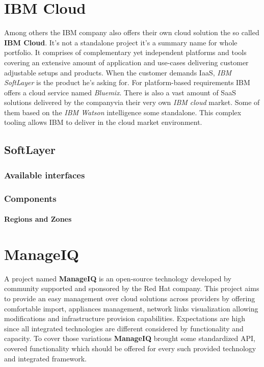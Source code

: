 \chapter{IBM Cloud}
\label{chap:IBM Cloud}

Among others the IBM company also offers their own cloud solution the so called \textbf{IBM Cloud}. It's not a standalone project it's a summary name for whole portfolio. It comprises of complementary yet independent platforms and tools covering an extensive amount of application and use-cases delivering customer adjustable setups and products. When the customer demands IaaS, \emph{IBM SoftLayer} is the product he's asking for. For platform-based requirements IBM offers a cloud service named \emph{Bluemix}. There is also a vast amount of SaaS solutions delivered by the companyvia their very own \emph{IBM cloud} market. Some of them based on the \emph{IBM Watson} intelligence some standalone. This complex tooling allows IBM to deliver in the cloud market environment.

\section{SoftLayer}
\label{sec:SoftLayer}

\subsection{Available interfaces}
\label{sub:Available interfaces}

\subsection{Components}
\label{sub:Components}

\subsubsection{Regions and Zones}
\label{subs:Regions and Zones}



\chapter{ManageIQ}
\label{chap:ManageIQ}

A project named \textbf{ManageIQ} is an open-source technology developed by community supported and sponsored by the Red Hat company. This project aims to provide an easy management over cloud solutions across providers by offering comfortable import, appliances management, network links visualization allowing modifications and infrastructure provision capabilities. Expectations are high since all integrated technologies are different considered by functionality and capacity. To cover those variations \textbf{ManageIQ} brought some standardized API, covered functionality which should be offered for every such provided technology and integrated framework.


